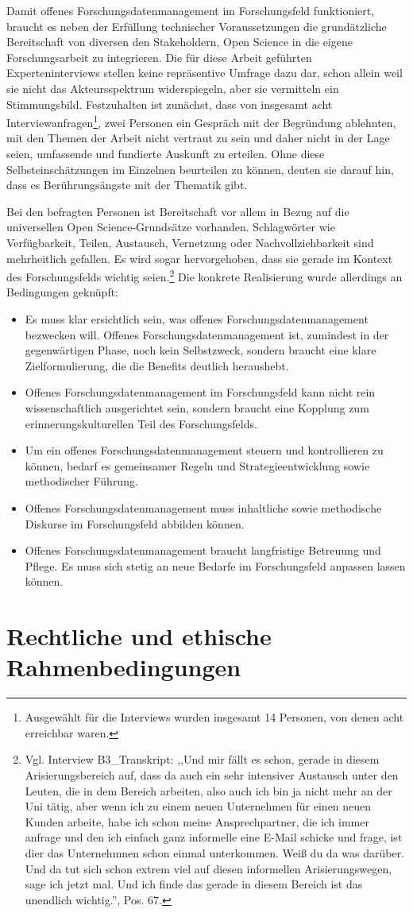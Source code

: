 Damit offenes Forschungsdatenmanagement im Forschungsfeld funktioniert, braucht es neben der Erfüllung technischer Voraussetzungen die grundätzliche Bereitschaft von diversen den Stakeholdern, Open Science in die eigene Forschungsarbeit zu integrieren. Die für diese Arbeit geführten Experteninterviews stellen keine repräsentive Umfrage dazu dar, schon allein weil sie nicht das Akteursspektrum widerspiegeln, aber sie vermitteln ein Stimmungsbild. Festzuhalten ist zunächst, dass von insgesamt acht Interviewanfragen\footnote{Ausgewählt für die Interviews wurden insgesamt 14 Personen, von denen acht erreichbar waren.}, zwei Personen ein Gespräch mit der Begründung ablehnten, mit den Themen der Arbeit nicht vertraut zu sein und daher nicht in der Lage seien, umfassende und fundierte Auskunft zu erteilen. Ohne diese Selbsteinschätzungen im Einzelnen beurteilen zu können, deuten sie darauf hin, dass es Berührungsängste mit der Thematik gibt.

Bei den befragten Personen ist Bereitschaft vor allem in Bezug auf die universellen Open Science-Grundsätze vorhanden. Schlagwörter wie Verfügbarkeit, Teilen, Austausch, Vernetzung oder Nachvollziehbarkeit sind mehrheitlich gefallen. Es wird sogar hervorgehoben, dass sie gerade im Kontext des Forschungsfelds wichtig seien.\footnote{Vgl. Interview B3\_Transkript: ,,Und mir fällt es schon, gerade in diesem Arisierungsbereich auf, dass da auch ein sehr intensiver Austausch unter den Leuten, die in dem Bereich arbeiten, also auch ich bin ja nicht mehr an der Uni tätig, aber wenn ich zu einem neuen Unternehmen für einen neuen Kunden arbeite, habe ich schon meine Ansprechpartner, die ich immer anfrage und den ich einfach ganz informelle eine E-Mail schicke und frage, ist dier das Unternehmnen schon einmal unterkommen. Weiß du da was darüber. Und da tut sich schon extrem viel auf diesen informellen Arisierungswegen, sage ich jetzt mal. Und ich finde das gerade in diesem Bereich ist das unendlich wichtig.'', Pos. 67.} Die konkrete Realisierung wurde allerdings an Bedingungen geknüpft:
\begin{itemize}
    \item Es muss klar ersichtlich sein, was offenes Forschungsdatenmanagement bezwecken will. Offenes Forschungsdatenmanagement ist, zumindest in der gegenwärtigen Phase, noch kein Selbstzweck, sondern braucht eine klare Zielformulierung, die die Benefits deutlich heraushebt.
    \item Offenes Forschungsdatenmanagement im Forschungsfeld kann nicht rein wissenschaftlich ausgerichtet sein, sondern braucht eine Kopplung zum erinnerungskulturellen Teil des Forschungsfelds.
    \item Um ein offenes Forschungsdatenmanagement steuern und kontrollieren zu können, bedarf es gemeinsamer Regeln und Strategieentwicklung sowie methodischer Führung.
    \item Offenes Forschungsdatenmanagement muss inhaltliche sowie methodische Diskurse im Forschungsfeld abbilden können.
    \item Offenes Forschungsdatenmanagement braucht langfristige Betreuung und Pflege. Es muss sich stetig an neue Bedarfe im Forschungsfeld anpassen lassen können.
\end{itemize}

\section{Rechtliche und ethische Rahmenbedingungen}



